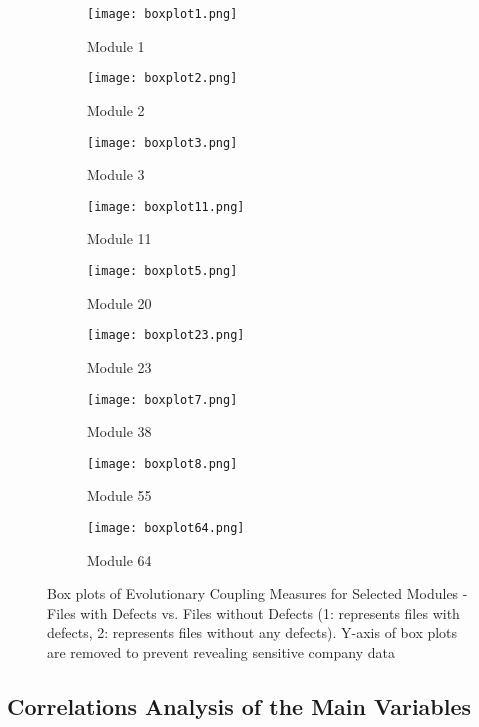 \documentclass[times]{smrauth}
\begin{document}
\begin{figure*}[h]
\centering
\begin{subfigure}{.33\textwidth}
  \centering
  \texttt{[image: boxplot1.png]}
  \caption{Module 1}
  \label{fig:sfig1}
\end{subfigure}%
\begin{subfigure}{.33\textwidth}
  \centering
  \texttt{[image: boxplot2.png]}
  \caption{Module 2}
  \label{fig:sfig2}
\end{subfigure}
\begin{subfigure}{.33\textwidth}
  \centering
  \texttt{[image: boxplot3.png]}
  \caption{Module 3}
  \label{fig:sfig3}
\end{subfigure}
\begin{subfigure}{.33\textwidth}
  \centering
  \texttt{[image: boxplot11.png]}
  \caption{Module 11}
  \label{fig:sfig4}
\end{subfigure}%
\begin{subfigure}{.33\textwidth}
  \centering
  \texttt{[image: boxplot5.png]}
  \caption{Module 20}
  \label{fig:sfig5}
\end{subfigure}
\begin{subfigure}{.33\textwidth}
  \centering
  \texttt{[image: boxplot23.png]}
  \caption{Module 23}
  \label{fig:sfig6}
\end{subfigure}
\begin{subfigure}{.33\textwidth}
  \centering
  \texttt{[image: boxplot7.png]}
    \caption{Module 38}
  \label{fig:sfig7}
\end{subfigure}%
\begin{subfigure}{.33\textwidth}
  \centering
  \texttt{[image: boxplot8.png]}
  \caption{Module 55}
  \label{fig:sfig8}
\end{subfigure}
\begin{subfigure}{.33\textwidth}
  \centering
  \texttt{[image: boxplot64.png]}
  \caption{Module 64}
  \label{fig:sfig9}
\end{subfigure}
\caption{Box plots of Evolutionary Coupling Measures for Selected Modules - Files with Defects vs. Files without Defects (1: represents files with defects, 2: represents files without any defects). Y-axis of box plots are removed to prevent revealing sensitive company data}
\label{boxplots}
\end{figure*}

\newpage
\subsection{Correlations Analysis of the Main Variables}
\end{document}
